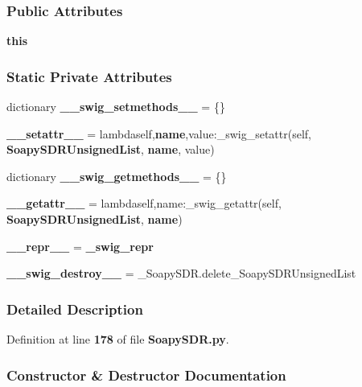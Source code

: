 \subsubsection*{Public Attributes}
\begin{DoxyCompactItemize}
\item 
{\bf this}
\end{DoxyCompactItemize}
\subsubsection*{Static Private Attributes}
\begin{DoxyCompactItemize}
\item 
dictionary {\bf \+\_\+\+\_\+swig\+\_\+setmethods\+\_\+\+\_\+} = \{\}
\item 
{\bf \+\_\+\+\_\+setattr\+\_\+\+\_\+} = lambdaself,{\bf name},value\+:\+\_\+swig\+\_\+setattr(self, {\bf Soapy\+S\+D\+R\+Unsigned\+List}, {\bf name}, value)
\item 
dictionary {\bf \+\_\+\+\_\+swig\+\_\+getmethods\+\_\+\+\_\+} = \{\}
\item 
{\bf \+\_\+\+\_\+getattr\+\_\+\+\_\+} = lambdaself,name\+:\+\_\+swig\+\_\+getattr(self, {\bf Soapy\+S\+D\+R\+Unsigned\+List}, {\bf name})
\item 
{\bf \+\_\+\+\_\+repr\+\_\+\+\_\+} = {\bf \+\_\+swig\+\_\+repr}
\item 
{\bf \+\_\+\+\_\+swig\+\_\+destroy\+\_\+\+\_\+} = \+\_\+\+Soapy\+S\+D\+R.\+delete\+\_\+\+Soapy\+S\+D\+R\+Unsigned\+List
\end{DoxyCompactItemize}


\subsubsection{Detailed Description}


Definition at line {\bf 178} of file {\bf Soapy\+S\+D\+R.\+py}.



\subsubsection{Constructor \& Destructor Documentation}
